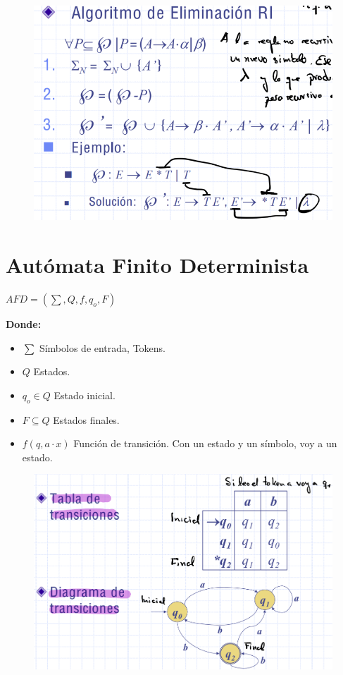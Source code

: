 \documentclass[12pt]{report} %
\begin{document}
\begin{figure}[H]
	{\includegraphics[scale=.4]{Untitled 2.png}}
\end{figure}

\section{Autómata Finito Determinista}

\(AFD=( \sum, Q, f, q_o, F)\)

\textbf{Donde:}

\begin{itemize}
\item
  \(\sum\) Símbolos de entrada, Tokens.
\item
  \(Q\) Estados.
\item
  \(q_o \in Q\) Estado inicial.
\item
  \(F \subseteq Q\) Estados finales.
\item
  \(f(q,a \cdot x)\) Función de transición. Con un estado y un símbolo,
  voy a un estado.
\end{itemize}

\begin{figure}[H]
	{\includegraphics[scale=.25]{Untitled 3.png}}
\end{figure}
\end{document}
